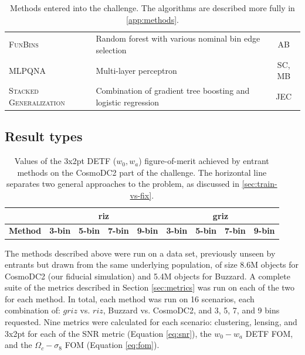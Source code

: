\documentclass[twocolumn,twocolappendix]{aastex63}
\begin{document}
\begin{table}[]
\begin{tabular}{|l|p{8cm}|c|}
	\textsc{FunBins} & Random forest with various nominal bin edge selection & AB \\
	\textsc{MLPQNA} & Multi-layer perceptron & SC, MB \\
	\textsc{Stacked Generalization} & Combination of gradient tree boosting and logistic regression & JEC\\
	\hline
	\end{tabular}
	\caption{Methods entered into the challenge. The algorithms are described more fully in \autoref{app:methods}.}
	\label{tab:entrants}
\end{table}



\subsection{Result types}

\begin{table}[]
	\begin{tabular}{|l|llll|llll|}
		\hline
		& \multicolumn{4}{c|}{\textbf{riz}}      & \multicolumn{4}{c|}{\textbf{griz}}                                \\ \hline
		\textbf{Method} & \textbf{3-bin} & \textbf{5-bin} & \textbf{7-bin} & \textbf{9-bin} & \textbf{3-bin} & \textbf{5-bin} & \textbf{7-bin} & \textbf{9-bin} \\ \hline
		
		\hline
	\end{tabular}
	\caption{Values of the 3x2pt DETF ($w_0,w_a$) figure-of-merit achieved by entrant methods on the 
		CosmoDC2 part of the challenge. The horizontal line separates two general approaches to the problem, as discussed in \autoref{sec:train-vs-fix}.}
	\label{tab:cosmodc2}
\end{table}

The methods described above were run on a data set, previously unseen by entrants but drawn
from the same underlying population, of size 8.6M objects for CosmoDC2 (our fiducial simulation) and 5.4M objects for Buzzard.
A complete suite of the metrics described in Section \ref{sec:metrics} was run on each of the two
for each method.  In total, each method was run on 16 scenarios, each combination of: $griz$ vs. $riz$,
Buzzard vs. CosmoDC2, and 3, 5, 7, and 9 bins requested.  Nine metrics were calculated for each
scenario: clustering, lensing, and 3x2pt for each of the SNR metric (Equation \ref{eq:snr}), the $w_0-w_a$ 
DETF FOM, and the $\Omega_c - \sigma_8$ FOM (Equation \ref{eq:fom}).
\end{document}
